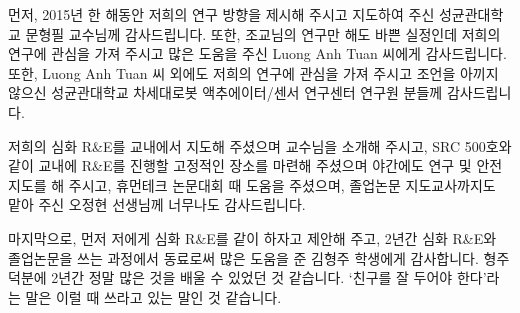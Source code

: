 \clearpage
\begin{onehalfspace} %
	
	
\end{onehalfspace}



\begin{acknowledgements}
먼저, 2015년 한 해동안 저희의 연구 방향을 제시해 주시고 지도하여 주신 성균관대학교 문형필 교수님께 감사드립니다. 또한, 조교님의 연구만 해도 바쁜 실정인데 저희의 연구에 관심을 가져 주시고 많은 도움을 주신 Luong Anh Tuan 씨에게 감사드립니다. 또한, Luong Anh Tuan 씨 외에도 저희의 연구에 관심을 가져 주시고 조언을 아끼지 않으신 성균관대학교 차세대로봇 액추에이터/센서 연구센터 연구원 분들께 감사드립니다.

저희의 심화 R\&E를 교내에서 지도해 주셨으며 교수님을 소개해 주시고, SRC 500호와 같이 교내에 R\&E를 진행할 고정적인 장소를 마련해 주셨으며 야간에도 연구 및 안전 지도를 해 주시고, 휴먼테크 논문대회 때 도움을 주셨으며, 졸업논문 지도교사까지도 맡아 주신 오정현 선생님께 너무나도  감사드립니다.

마지막으로, 먼저 저에게 심화 R\&E를 같이 하자고 제안해 주고, 2년간 심화 R\&E와 졸업논문을 쓰는 과정에서 동료로써 많은 도움을 준 김형주 학생에게 감사합니다. 형주 덕분에 2년간 정말 많은 것을 배울 수 있었던 것 같습니다. `친구를 잘 두어야 한다'라는 말은 이럴 때 쓰라고 있는 말인 것 같습니다.
\end{acknowledgements}

